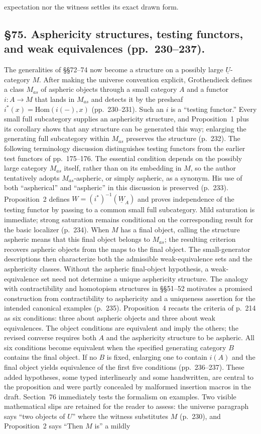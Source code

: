 \documentclass[10pt,oneside]{book}
\begin{document}
expectation nor the witness settles its exact drawn form.

\subsection*{\S75. Asphericity structures, testing functors, and weak equivalences (pp.\ 230--237).}
The generalities of \S\S72--74 now become a structure on a possibly large $\underline U$-category $M$. After making the universe convention explicit, Grothendieck defines a class $M_{as}$ of aspheric objects through a small category $A$ and a functor $i:A\to M$ that lands in $M_{as}$ and detects it by the presheaf $i^*(x)=\mathrm{Hom}(i(-),x)$ (pp.\ 230--231). Such an $i$ is a “testing functor.” Every small full subcategory supplies an asphericity structure, and Proposition~1 plus its corollary shows that any structure can be generated this way; enlarging the generating full subcategory within $M_{as}$ preserves the structure (p.\ 232). The following terminology discussion distinguishes testing functors from the earlier test functors of pp.\ 175--176. The essential condition depends on the possibly large category $M_{as}$ itself, rather than on its embedding in $M$, so the author tentatively adopts $M_{as}$-aspheric, or simply aspheric, as a synonym. His use of both “aspherical” and “aspheric” in this discussion is preserved (p.\ 233). Proposition~2 defines $W=(i^*)^{-1}(\underline W_A)$ and proves independence of the testing functor by passing to a common small full subcategory. Mild saturation is immediate; strong saturation remains conditional on the corresponding result for the basic localizer (p.\ 234). When $M$ has a final object, calling the structure aspheric means that this final object belongs to $M_{as}$; the resulting criterion recovers aspheric objects from the maps to the final object. The small-generator descriptions then characterize both the admissible weak-equivalence sets and the asphericity classes. Without the aspheric final-object hypothesis, a weak-equivalence set need not determine a unique asphericity structure. The analogy with contractibility and homotopism structures in \S\S51--52 motivates a promised construction from contractibility to asphericity and a uniqueness assertion for the intended canonical examples (p.\ 235). Proposition~4 recasts the criteria of p.\ 214 as six conditions: three about aspheric objects and three about weak equivalences. The object conditions are equivalent and imply the others; the revised converse requires both $A$ and the asphericity structure to be aspheric. All six conditions become equivalent when the specified generating category $B$ contains the final object. If no $B$ is fixed, enlarging one to contain $i(A)$ and the final object yields equivalence of the first five conditions (pp.\ 236--237). These added hypotheses, some typed interlinearly and some handwritten, are central to the proposition and were partly concealed by malformed insertion macros in the draft. Section~76 immediately tests the formalism on examples. Two visible mathematical slips are retained for the reader to assess: the universe paragraph says “two objects of $U$” where the witness substitutes $M$ (p.\ 230), and Proposition~2 says “Then $M$ is” a mildly 
\end{document}
